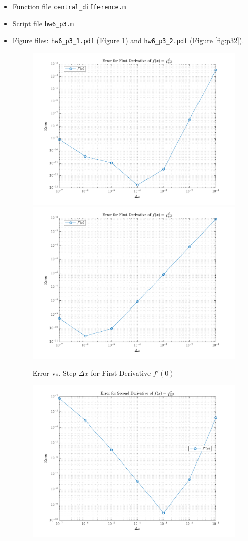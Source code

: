 \begin{solution}
  \quad
  \begin{itemize}
    \item
      Function file \verb|central_difference.m|
      
    \item
      Script file \verb|hw6_p3.m|
      
      \newpage
    \item
      Figure files: \verb|hw6_p3_1.pdf| (Figure \ref{fig:p31}) and \verb|hw6_p3_2.pdf| (Figure \ref{fig:p32}).
      \begin{figure}[!hbtp]
        \centering
        \includegraphics[width=0.75\linewidth]{../src/hw6_p3_1.pdf}
        \includegraphics[width=0.75\linewidth]{../src/hw6_p3_3.pdf}
        \caption{Error vs. Step $\Delta x$ for First Derivative $f'(0)$}%
        \label{fig:p31}
      \end{figure}
      \begin{figure}[!hbtp]
        \centering
        \includegraphics[width=0.75\linewidth]{../src/hw6_p3_2.pdf}

\end{figure}
\end{itemize}
\end{solution}
